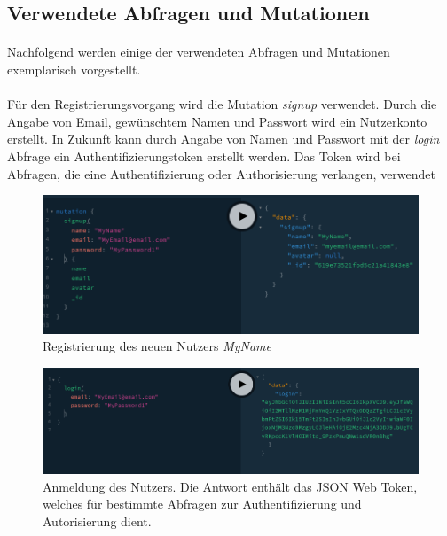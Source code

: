 \subsection{Verwendete Abfragen und Mutationen}
\paragraph{}
Nachfolgend werden einige der verwendeten Abfragen und Mutationen exemplarisch vorgestellt.

\paragraph{}
Für den Registrierungsvorgang wird die Mutation \textit{signup} verwendet.
Durch die Angabe von Email, gewünschtem Namen und Passwort wird ein Nutzerkonto erstellt.
In Zukunft kann durch Angabe von Namen und Passwort mit der \textit{login} Abfrage ein Authentifizierungstoken erstellt werden.
Das Token wird bei Abfragen, die eine Authentifizierung oder Authorisierung verlangen, verwendet

\begin{figure}
	\centering
    \includegraphics[width=\textwidth]{sources/graphiql_signup.png}
	\caption{Registrierung des neuen Nutzers \textit{MyName}}
	\label{fig:gql:2}
\end{figure}

\begin{figure}
	\centering
    \includegraphics[width=\textwidth]{sources/graphiql_login.png}
	\caption{Anmeldung des Nutzers. Die Antwort enthält das JSON Web Token, welches für bestimmte Abfragen zur Authentifizierung und Autorisierung dient.}
	\label{fig:gql:3}
\end{figure}

